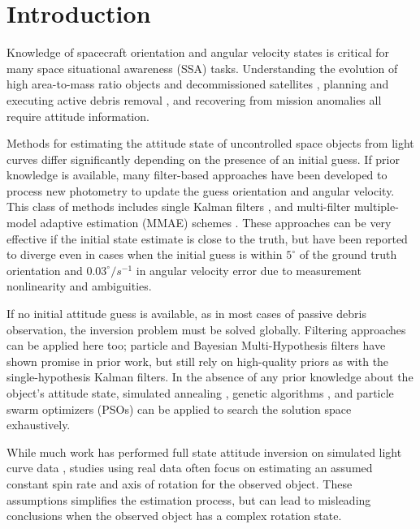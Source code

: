 \documentclass[a4paper,twocolumn]{spaceDebrisC} %
\begin{document}
\section{Introduction}

Knowledge of spacecraft orientation and angular velocity states is critical for many space situational awareness (SSA) tasks. Understanding the evolution of high area-to-mass ratio objects \cite{frueh2014} and decommissioned satellites \cite{rachman2023}, planning and executing active debris removal \cite{bonnal2013}, and recovering from mission anomalies \cite{umansky2023} all require attitude information. 

Methods for estimating the attitude state of uncontrolled space objects from light curves differ significantly depending on the presence of an initial guess. If prior knowledge is available, many filter-based approaches have been developed to process new photometry to update the guess orientation and angular velocity. This class of methods includes single Kalman filters \cite{burton2021two, gagnon2024, wetterer2009}, and multi-filter multiple-model adaptive estimation (MMAE) schemes \cite{linares2014space, dianetti2020}. These approaches can be very effective if the initial state estimate is close to the truth, but have been reported to diverge even in cases when the initial guess is within $5^\circ$ of the ground truth orientation and $0.03^\circ/s^{-1}$ in angular velocity error \cite{gagnon2024} due to measurement nonlinearity and ambiguities.

If no initial attitude guess is available, as in most cases of passive debris observation, the inversion problem must be solved globally. Filtering approaches can be applied here too; particle \cite{linares2014particle, holzinger2014} and Bayesian Multi-Hypothesis filters \cite{burton2021two, cabrera2023} have shown promise in prior work, but still rely on high-quality priors as with the single-hypothesis Kalman filters. In the absence of any prior knowledge about the object's attitude state, simulated annealing \cite{gagnon2024, clark2020}, genetic algorithms \cite{gagnon2024, piergentili2017, clark2020}, and particle swarm optimizers (PSOs) \cite{clark2020, clark2022, burton2024journal, burton2024scitech, gagnon2024, gagnon2025} can be applied to search the solution space exhaustively.

While much work has performed full state attitude inversion on simulated light curve data \cite{burton2024journal, gagnon2024, robinson2025att}, studies using real data often focus on estimating an assumed constant spin rate and axis of rotation for the observed object. These assumptions simplifies the estimation process, but can lead to misleading conclusions when the observed object has a complex rotation state.
\end{document}
